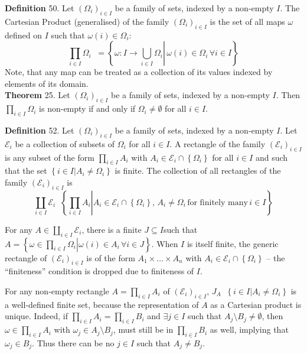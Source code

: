 \documentclass[a4paper]{article}
\newcommand{\obj}[1]{\left\{ #1 \right \}}
\newcommand{\brac}[1]{\left ( #1 \right )}
\newcommand{\induc}[1]{\left . #1 \right \vert}
\newcommand{\Ecal}{\mathcal{E}}
\newcommand{\defn}{\mathop{\overset{\Delta}{=}}\nolimits}
\begin{document}
\noindent \textbf{Definition} 50.
Let $\brac{\Omega_i}_{i\in I}$ be a family of sets, indexed by a non-empty $I$. The Cartesian Product (generalised) of the family $\brac{\Omega_i}_{i\in I}$ is the set of all maps $\omega$ defined on $I$ such that $\omega\brac{i}\in \Omega_i$:\[\prod_{i\in I} \Omega_i \defn = \obj{ \induc{ \omega:I\to \bigcup_{i\in I} \Omega_i }\, \omega\brac{i}\in \Omega_i\, \forall i\in I }\] Note, that any map can be treated as a collection of its values indexed by elements of its domain.\\

\label{thm:AOChoice} \noindent \textbf{Theorem} 25.
Let $\brac{\Omega_i}_{i\in I}$ be a family of sets, indexed by a non-empty $I$. Then $\prod_{i\in I} \Omega_i$ is non-empty if and only if $\Omega_i\neq \emptyset$ for all $i\in I$.

\noindent \textbf{Definition} 52.
Let $\brac{\Omega_i}_{i\in I}$ be a family of sets, indexed by a non-empty $I$. Let $\Ecal_i$ be a collection of subsets of $\Omega_i$ for all $i\in I$. A rectangle of the family $\brac{\Ecal_i}_{i\in I}$ is any subset of the form $\prod_{i\in I} A_i$ with $A_i\in \Ecal_i \cap \obj{\Omega_i}$ for all $i\in I$ and such that the set $\obj{\induc{i\in I} A_i\neq \Omega_i}$ is finite. The collection of all rectangles of the family $\brac{\Ecal_i}_{i\in I}$ is \[\coprod_{i\in I} \Ecal_i \defn \obj{ \induc{ \prod_{i\in I} A_i } A_i \in \Ecal_i \cap \obj{\Omega_i},\, A_i\neq \Omega_i\,\text{for finitely many}\, i\in I }\]

For any $A\in \coprod_{i\in I} \Ecal_i$, there is a finite $J\subseteq I$such that $A = \obj{ \induc{ \omega\in \prod_{i\in I} \Omega_i } \omega\brac{i} \in A_i\, \forall i\in J}$. When $I$ is itself finite, the generic rectangle of $\brac{\Ecal_i}_{i\in I}$ is of the form $A_1\times \ldots \times A_n$ with $A_i\in \Ecal_i \cap \obj{\Omega_i}$ -- the ``finiteness'' condition is dropped due to finiteness of $I$.

For any non-empty rectangle $A = \prod_{i\in I} A_i$ of $\brac{\Ecal_i}_{i\in I}$, $J_A\defn \obj{ \induc{i\in I} A_i \neq \Omega_i }$ is a well-defined finite set, because the representation of $A$ as a Cartesian product is unique. Indeed, if $\prod_{i\in I} A_i = \prod_{i\in I} B_i$ and $\exists j\in I$ such that $A_j\setminus B_j\neq \emptyset$, then $\omega\in \prod_{i\in I} A_i$ with $\omega_j \in A_j\setminus B_j$, must still be in $\prod_{i\in I} B_i$ as well, implying that $\omega_j\in B_j$. Thus there can be no $j\in I$ such that $A_j\neq B_j$.\\
\end{document}
